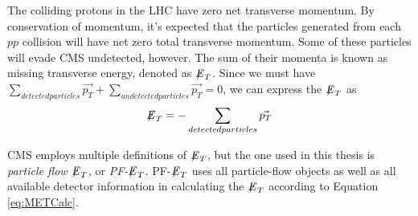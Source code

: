 The colliding protons in the LHC have zero net transverse momentum. By conservation of momentum, it's expected that the particles generated from each $pp$ collision will have net zero total transverse momentum. Some of these particles will evade CMS undetected, however. The sum of their momenta is known as missing transverse energy, denoted as ${\not\mathrel{E}}_T$. Since we must have $\sum_{detected particles} \vec{p_T} + \sum_{undetected particles} \vec{p_T} = 0$, we can express the ${\not\mathrel{E}}_T$ as
\begin{equation} \label{eq:METCalc}
{\not\mathrel{E}}_T = - \sum_{detected particles} \vec{p_T}
\end{equation}

CMS employs multiple definitions of ${\not\mathrel{E}}_T$, but the one used in this thesis is \textit{particle flow ${\not\mathrel{E}}_T$}, or \textit{PF-${\not\mathrel{E}}_T$}. PF-${\not\mathrel{E}}_T$ uses all particle-flow objects as well as all available detector information in calculating the ${\not\mathrel{E}}_T$ according to Equation \ref{eq:METCalc}.
